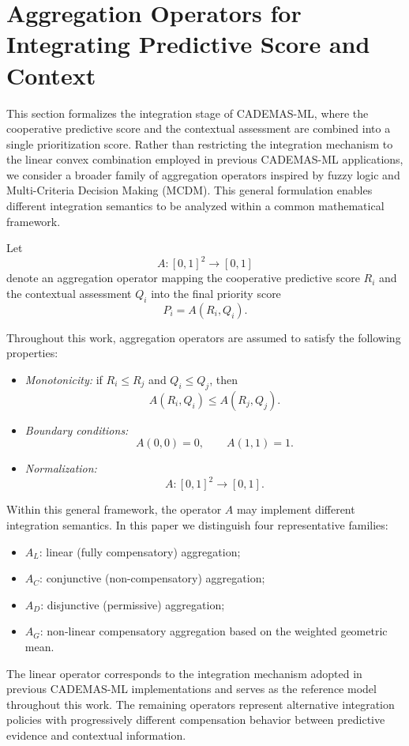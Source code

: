 \documentclass[mathematics,article,submit,moreauthors]{Definitions/mdpi}
\begin{document}
{\color{blue}
\section{Aggregation Operators for Integrating Predictive Score and Context}
\label{sect:aggregation_operators}

This section formalizes the integration stage of CADEMAS-ML, where the cooperative predictive score and the contextual assessment are combined into a single prioritization score. Rather than restricting the integration mechanism to the linear convex combination employed in previous CADEMAS-ML applications, we consider a broader family of aggregation operators inspired by fuzzy logic and Multi-Criteria Decision Making (MCDM). This general formulation enables different integration semantics to be analyzed within a common mathematical framework.

Let
\[
A:[0,1]^2 \rightarrow [0,1]
\]
denote an aggregation operator mapping the cooperative predictive score $R_i$ and the contextual assessment $Q_i$ into the final priority score
\[
P_i = A(R_i,Q_i).
\]

Throughout this work, aggregation operators are assumed to satisfy the following properties:

\begin{itemize}
\item \textit{Monotonicity:} if $R_i\le R_j$ and $Q_i\le Q_j$, then
\[
A(R_i,Q_i)\le A(R_j,Q_j).
\]

\item \textit{Boundary conditions:}
\[
A(0,0)=0,\qquad A(1,1)=1.
\]

\item \textit{Normalization:}
\[
A:[0,1]^2\rightarrow[0,1].
\]
\end{itemize}

Within this general framework, the operator $A$ may implement different integration semantics. In this paper we distinguish four representative families:

\begin{itemize}
\item $A_L$: linear (fully compensatory) aggregation;
\item $A_C$: conjunctive (non-compensatory) aggregation;
\item $A_D$: disjunctive (permissive) aggregation;
\item $A_G$: non-linear compensatory aggregation based on the weighted geometric mean.
\end{itemize}

The linear operator corresponds to the integration mechanism adopted in previous CADEMAS-ML implementations and serves as the reference model throughout this work. The remaining operators represent alternative integration policies with progressively different compensation behavior between predictive evidence and contextual information.
}
\end{document}
